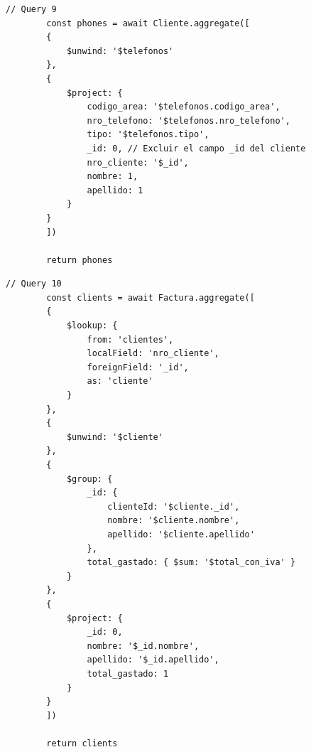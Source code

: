 \documentclass[a4paper,12pt]{article}
\begin{document}
	\bigskip
	
	\begin{lstlisting}[frame=single, tabsize=1]
		// Query 9
		const phones = await Cliente.aggregate([
		{
			$unwind: '$telefonos'
		},
		{
			$project: {
				codigo_area: '$telefonos.codigo_area',
				nro_telefono: '$telefonos.nro_telefono',
				tipo: '$telefonos.tipo',
				_id: 0, // Excluir el campo _id del cliente
				nro_cliente: '$_id',
				nombre: 1,
				apellido: 1
			}
		}
		])
		
		return phones
	\end{lstlisting}
	
	\bigskip
	
	\begin{lstlisting}[frame=single, tabsize=1]
		// Query 10
		const clients = await Factura.aggregate([
		{
			$lookup: {
				from: 'clientes',
				localField: 'nro_cliente',
				foreignField: '_id',
				as: 'cliente'
			}
		},
		{
			$unwind: '$cliente'
		},
		{
			$group: {
				_id: {
					clienteId: '$cliente._id',
					nombre: '$cliente.nombre',
					apellido: '$cliente.apellido'
				},
				total_gastado: { $sum: '$total_con_iva' }
			}
		},
		{
			$project: {
				_id: 0,
				nombre: '$_id.nombre',
				apellido: '$_id.apellido',
				total_gastado: 1
			}
		}
		])
		
		return clients
	\end{lstlisting}
	
\end{document}
